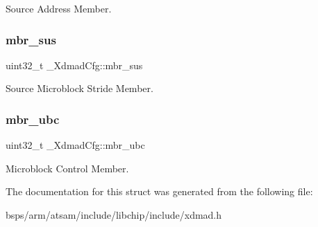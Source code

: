 Source Address Member. \mbox{\label{struct__XdmadCfg_a1498060a769a26a2a920c06a32e6cf83}} 
\subsubsection{\texorpdfstring{mbr\_sus}{mbr\_sus}}
{\footnotesize\ttfamily uint32\+\_\+t \+\_\+\+Xdmad\+Cfg\+::mbr\+\_\+sus}

Source Microblock Stride Member. \mbox{\label{struct__XdmadCfg_ad95ef2b80230c1a5452a41a62120ab65}} 
\subsubsection{\texorpdfstring{mbr\_ubc}{mbr\_ubc}}
{\footnotesize\ttfamily uint32\+\_\+t \+\_\+\+Xdmad\+Cfg\+::mbr\+\_\+ubc}

Microblock Control Member. 

The documentation for this struct was generated from the following file\+:\begin{DoxyCompactItemize}
\item 
bsps/arm/atsam/include/libchip/include/xdmad.\+h\end{DoxyCompactItemize}
